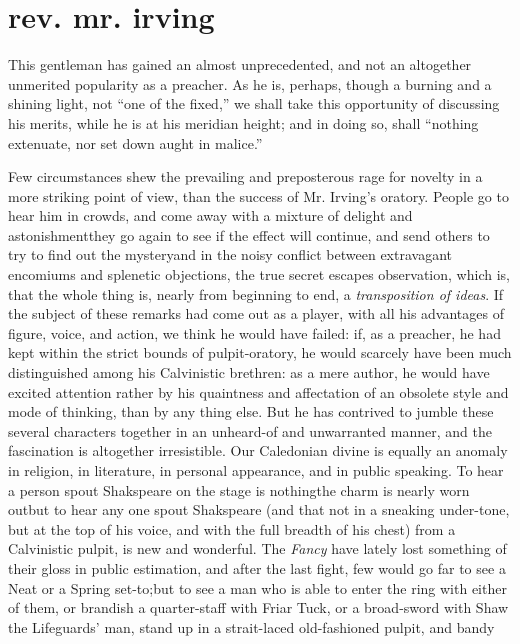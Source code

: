 \chapter[Rev. Mr. Irving]{rev. mr. irving}


This gentleman has gained an almost unprecedented, and not an
altogether unmerited popularity as a preacher. As he is, perhaps,
though a burning and a shining light, not ``one of the fixed,'' we
shall take this opportunity of discussing his merits, while he is
at his meridian height; and in doing so, shall ``nothing extenuate,
nor set down aught in malice.''

Few circumstances shew the prevailing and preposterous rage for
novelty in a more striking point of view, than the success of
Mr. Irving's oratory. People go to hear him in crowds, and come
away with a mixture of delight and astonishment\textemdash they go
again to see if the effect will continue, and send others to try
to find out the mystery\textemdash and in the noisy conflict
between extravagant encomiums and splenetic objections, the true
secret escapes observation, which is, that the whole thing is,
nearly from beginning to end, a \emph{transposition of ideas}. If the
subject of these remarks had come out as a player, with all his
advantages of figure, voice, and action, we think he would have
failed: if, as a preacher, he had kept within the strict bounds of
pulpit-oratory, he would scarcely have been much distinguished
among his Calvinistic brethren: as a mere author, he would have
excited attention rather by his quaintness and affectation of an
obsolete style and mode of thinking, than by any thing else. But
he has contrived to jumble these several characters together in an
unheard-of and unwarranted manner, and the fascination is
altogether irresistible. Our Caledonian divine is equally an
anomaly in religion, in literature, in personal appearance, and in
public speaking. To hear a person spout Shakspeare on the stage is
nothing\textemdash the charm is nearly worn out\textemdash but to
hear any one spout Shakspeare (and that not in a sneaking
under-tone, but at the top of his voice, and with the full breadth
of his chest) from a Calvinistic pulpit, is new and wonderful. The
\emph{Fancy} have lately lost something of their gloss in public
estimation, and after the last fight, few would go far to see a
Neat or a Spring set-to;\textemdash but to see a man who is able
to enter the ring with either of them, or brandish a quarter-staff
with Friar Tuck, or a broad-sword with Shaw the Lifeguards' man,
stand up in a strait-laced old-fashioned pulpit, and bandy
